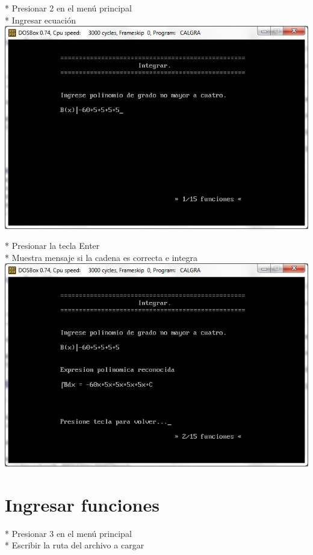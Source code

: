 \documentclass[journal]{../../IEEEtran/IEEEtran}
\begin{document}
* Presionar 2 en el menú principal\\

* Ingresar ecuación\\
\includegraphics[scale=0.42]{img/21.jpg}

* Presionar la tecla Enter\\

* Muestra mensaje si la cadena es correcta e integra\\
\includegraphics[scale=0.42]{img/22.jpg}

\section{Ingresar funciones}

* Presionar 3 en el menú principal\\

* Escribir la ruta del archivo a cargar\\
\end{document}
